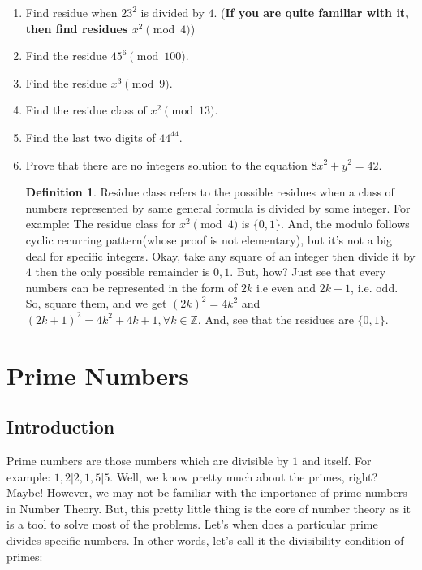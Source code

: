 \documentclass[a4paper,oneside,12 pt]{book}
\theoremstyle{definition}
\theoremstyle{definition}
\theoremstyle{definition}
\newtheorem{defn}{Definition}[section]
\begin{document}
\begin{enumerate}
\item Find residue when $23^2$ is divided by $4$.
(\textbf{If you are quite familiar with it, then find residues $x^2 \pmod{4}$})
\item Find the residue $45^6 \pmod{100}$.
\item Find the residue $x^3\pmod 9$.
\item Find the residue class of $x^2\pmod{13}$.
\item Find the last two digits of $44^{44}$.
\item Prove that there are no integers solution to the equation $8x^2+y^2=42$.

\begin{defn}
Residue class refers to the possible residues when a class of numbers represented by same general formula is divided by some integer. For example: The residue class for $x^2\pmod{4}$ is $\{0,1\}$. And, the modulo follows cyclic recurring pattern(whose proof is not elementary), but it's not a big deal for specific integers. Okay, take any square of an integer then divide it by $4$ then the only possible remainder is $0,1$. But, how? Just see that every numbers can be represented in the form of $2k$ i.e even and $2k+1$, i.e. odd. So, square them, and we get $(2k)^2=4k^2$ and $(2k+1)^2=4k^2+4k+1, \forall k \in \mathbb{Z}$. And, see that the residues are $\{0,1\}$.
\end{defn}
\end{enumerate}

\section{Prime Numbers}
\subsection{Introduction}
Prime numbers are those numbers which are divisible by $1$ and itself. For example: $1,2|2,1,5|5$. Well, we know pretty much about the primes, right? Maybe! However, we may not be familiar with the importance of prime numbers in Number Theory. But, this pretty little thing is the core of number theory as it is a tool to solve most of the problems.
Let's when does a particular prime divides specific numbers. In other words, let's call it the divisibility condition of primes:
\end{document}
